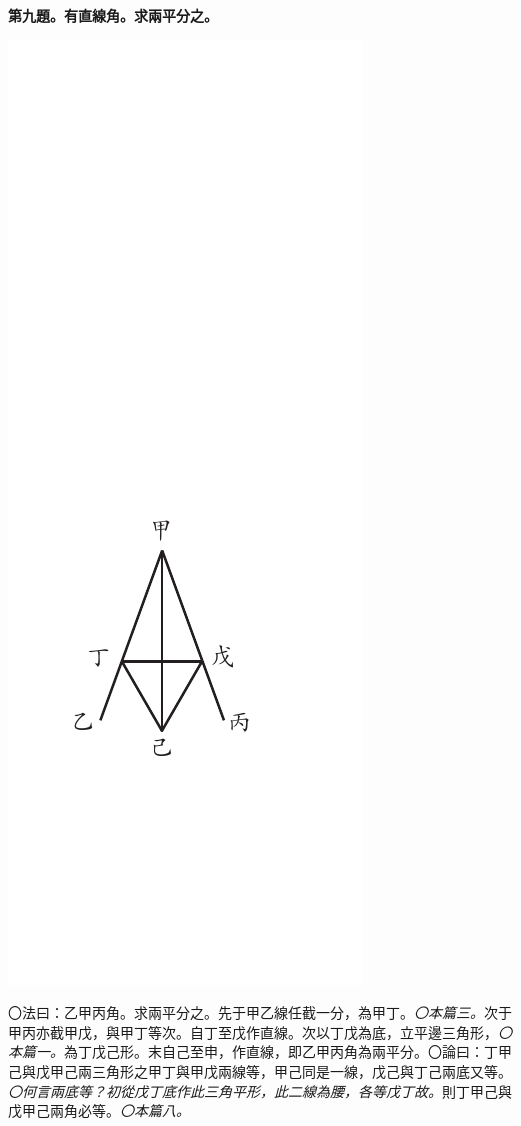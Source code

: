 \documentclass[12pt,b5paper,landscape]{article}
\newcommand{\ccom}[1]{{\footnotesize \emph{〇#1}}}
\newcommand{\bcom}[1]{〇#1}
\newcommand{\cthm}[1]{{
\vspace{8pt}

\bfseries #1}}
\begin{document}
\begin{multicols}{2}
\cthm{第九題。有直線角。求兩平分之。}
\begin{center}
\includegraphics[angle=90]{eu46}
\end{center}
\bcom{法曰：乙甲丙角。求兩平分之。先于甲乙線任截一分，為甲丁。\ccom{本篇三。}次于甲丙亦截甲戊，與甲丁等次。自丁至戊作直線。次以丁戊為底，立平邊三角形，\ccom{本篇一。}為丁戊己形。末自己至申，作直線，即乙甲丙角為兩平分。}\bcom{論曰：丁甲己與戊甲己兩三角形之甲丁與甲戊兩線等，甲己同是一線，戊己與丁己兩底又等。\ccom{何言兩底等？初從戊丁底作此三角平形，此二線為腰，各等戊丁故。}則丁甲己與戊甲己兩角必等。\ccom{本篇八。}}

\end{multicols}
\end{document}
